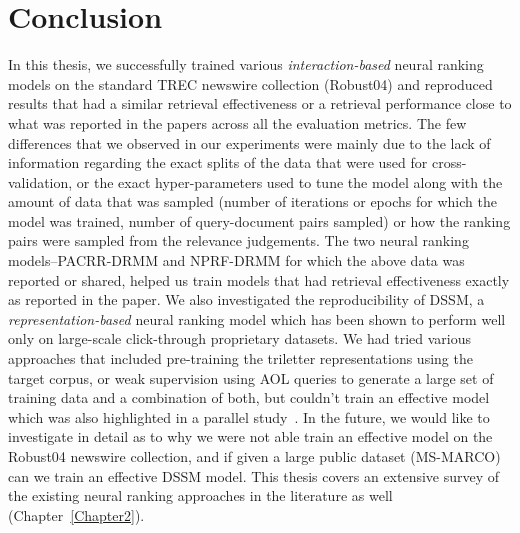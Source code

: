 
\chapter{Conclusion} %

\label{Chapter6} %


In this thesis, we successfully trained various \textit{interaction-based} neural ranking models on the standard TREC newswire collection (Robust04) and reproduced results that had a similar retrieval effectiveness or a retrieval performance close to what was reported in the papers across all the evaluation metrics. The few differences that we observed in our experiments were mainly due to the lack of information regarding the exact splits of the data that were used for cross-validation, or the exact hyper-parameters used to tune the model along with the amount of data that was sampled (number of iterations or epochs for which the model was trained, number of query-document pairs sampled) or how the ranking pairs were sampled from the relevance judgements. The two neural ranking models--PACRR-DRMM and NPRF-DRMM for which the above data was reported or shared, helped us train models that had retrieval effectiveness exactly as reported in the paper. We also investigated the reproducibility of DSSM, a \textit{representation-based} neural ranking model which has been shown to perform well only on large-scale click-through proprietary datasets. We had  tried various approaches that included pre-training the triletter representations using the target corpus, or weak supervision using AOL queries to generate a large set of training data and a combination of both, but couldn't train an effective model which was also highlighted in a parallel study~\citep{nie_ictir_18}. In the future, we would like to investigate in detail as to why we were not able train an effective model on the Robust04 newswire collection, and if given a large public dataset (MS-MARCO) can we train an effective DSSM model. %
This thesis  covers an extensive survey of the existing neural ranking approaches in the literature as well (Chapter~\ref{Chapter2}).

